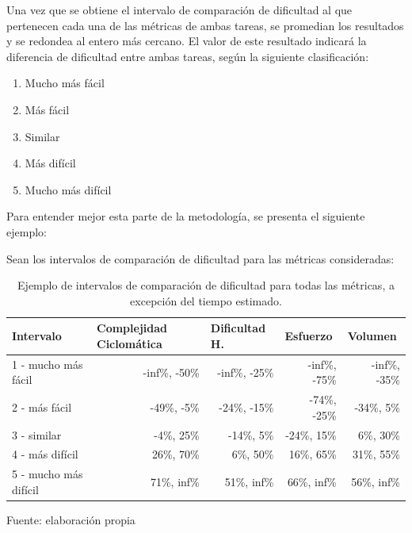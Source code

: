 \documentclass[letterpaper,12pt]{article}
\begin{document}
Una vez que se obtiene el intervalo de comparación de dificultad al que pertenecen cada una de las métricas de ambas tareas, se promedian los resultados y se redondea al entero más cercano. El valor de este resultado indicará la diferencia de dificultad entre ambas tareas, según la siguiente clasificación:

\begin{enumerate}
  \item Mucho más fácil
  \item Más fácil
  \item Similar
  \item Más difícil
  \item Mucho más difícil
\end{enumerate}

Para entender mejor esta parte de la metodología, se presenta el siguiente ejemplo:

Sean los intervalos de comparación de dificultad para las métricas consideradas:

\begin{table}[H]
  \centering
  \begin{tabular}{|l|r|r|r|r|}
    \hline
    \textbf{Intervalo}    & \multicolumn{1}{l|}{\textbf{Complejidad Ciclomática}} & \multicolumn{1}{l|}{\textbf{Dificultad H.}} & \multicolumn{1}{l|}{\textbf{Esfuerzo}} & \multicolumn{1}{l|}{\textbf{Volumen}} \\ \hline
    1 - mucho más fácil   & -inf\%, -50\%                                         & -inf\%, -25\%                               & -inf\%, -75\%                          & -inf\%, -35\%                         \\ \hline
    2 - más fácil         & -49\%, -5\%                                           & -24\%, -15\%                                & -74\%, -25\%                           & -34\%, 5\%                            \\ \hline
    3 - similar           & -4\%, 25\%                                            & -14\%, 5\%                                  & -24\%, 15\%                            & 6\%, 30\%                             \\ \hline
    4 - más difícil       & 26\%, 70\%                                            & 6\%, 50\%                                   & 16\%, 65\%                             & 31\%, 55\%                            \\ \hline
    5 - mucho más difícil & 71\%, inf\%                                           & 51\%, inf\%                                 & 66\%, inf\%                            & 56\%, inf\%                           \\ \hline
  \end{tabular}
  \caption{Ejemplo de intervalos de comparación de dificultad para todas las métricas, a excepción del tiempo estimado.} Fuente: elaboración propia
  \label{tab:example-difficulty-interval}
\end{table}
\end{document}
